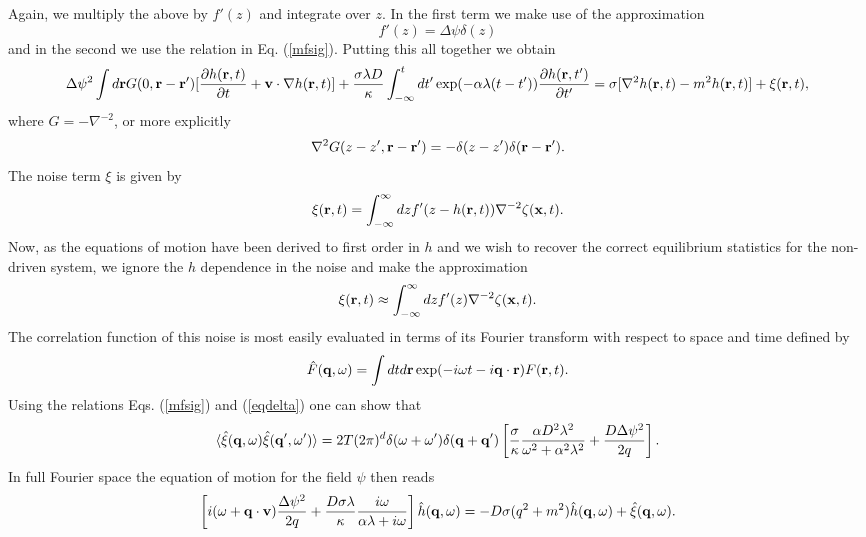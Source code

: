 Again, we multiply the above by $f'(z)$ and integrate over $z$. In the first term we make use of the approximation
\begin{equation}
f'(z)=\Delta\psi \delta(z)\label{eqdelta}
\end{equation}
and in the second we use the relation in Eq. (\ref{mfsig}). Putting this all together we obtain
\begin{equation}
\Delta\psi^2 \int d{\bf r} G(0,{\bf r}-{\bf r}') [\frac{\partial h({\bf r},t)}{\partial t} +{\bf v}\cdot\nabla h({\bf r},t)] +\frac{\sigma\lambda D}{\kappa}\int_{-\infty}^t dt'
\exp(-\alpha\lambda(t-t'))\frac{\partial h({\bf r},t')}{\partial t'}
= \sigma[\nabla^2 h({\bf r},t)-m^2 h({\bf r},t)] + \xi({\bf r},t),\label{em}
\end{equation}
where $G= -\nabla^{-2}$, or more explicitly
\begin{equation}
\nabla^2 G(z-z',{\bf r}-{\bf r}') = -\delta(z-z') \delta({\bf r}-{\bf r'}).
\end{equation}
The noise term $\xi$ is given by
\begin{equation}
\xi({\bf r},t) = \int_{-\infty}^{\infty} dz f'(z-h({\bf r},t)) \nabla^{-2} \zeta({\bf x},t).
\end{equation}
Now, as the equations of motion have been derived to first order in $h$ and we wish to recover the correct equilibrium statistics for the non-driven system, we ignore the $h$ dependence in the noise and make the approximation
\begin{equation}
\xi({\bf r},t) \approx \int_{-\infty}^{\infty} dz f'(z) \nabla^{-2} \zeta({\bf x},t).
\end{equation}
The correlation function of this noise is most easily evaluated in terms of its Fourier transform with respect to  space and time  defined by
\begin{equation}
\hat F({\bf q},\omega)=\int dt d{\bf r}\exp(-i\omega t -i{\bf q}\cdot{\bf r}) F({\bf r},t).
\end{equation}
Using the relations Eqs. (\ref{mfsig}) and (\ref{eqdelta}) one  can show that
\begin{equation}
\langle \hat \xi({\bf q},\omega)\hat \xi({\bf q}',\omega')\rangle 
=2T(2\pi)^d \delta(\omega +\omega') \delta({\bf q}+{\bf q}') \left[
\frac{\sigma}{\kappa}\frac{\alpha D^2\lambda^2}{\omega^2 +\alpha^2\lambda^2} + \frac{D\Delta\psi^2}{2q}\right].
\end{equation}
In full Fourier space the equation of motion for the field $\psi$ then reads
\begin{equation}
\left[i(\omega+{\bf q}\cdot{\bf v})\frac{\Delta\psi^2}{2q} + \frac{D\sigma\lambda}{\kappa} \frac{i\omega}{\alpha\lambda+i\omega}\right] \hat h({\bf q},\omega)= -D\sigma(q^2+m^2)\hat h({\bf q},\omega)+ \hat\xi({\bf q},\omega).\label{dyn}
\end{equation}

